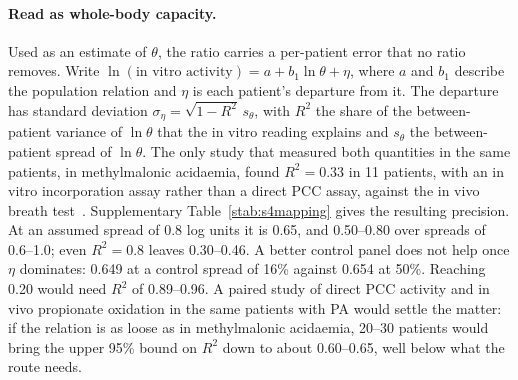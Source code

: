 \paragraph{Read as whole-body capacity.} Used as an estimate of $\theta$, the ratio carries a
per-patient error that no ratio removes. Write
$\ln(\text{in vitro activity})=a+b_1\ln\theta+\eta$, where $a$ and $b_1$ describe the population
relation and $\eta$ is each patient's departure from it. The departure has standard deviation
$\sigma_\eta=\sqrt{1-R^2}\,s_\theta$, with $R^2$ the share of the between-patient variance of
$\ln\theta$ that the in vitro reading explains and $s_\theta$ the between-patient spread of
$\ln\theta$. The only study that measured both quantities in the same patients, in
methylmalonic acidaemia, found $R^2=0.33$ in 11 patients, with an in vitro incorporation assay
rather than a direct PCC assay, against the in vivo breath test~\cite{breath_test_mma}.
Supplementary Table~\ref{stab:s4mapping} gives the resulting precision. At an assumed spread of
0.8 log units it is 0.65, and 0.50--0.80 over spreads of 0.6--1.0; even $R^2=0.8$ leaves
0.30--0.46. A better control panel does not help once $\eta$ dominates: 0.649 at a control
spread of 16\% against 0.654 at 50\%. Reaching 0.20 would need $R^2$ of 0.89--0.96. A paired
study of direct PCC activity and in vivo propionate oxidation in the same patients with PA would
settle the matter: if the relation is as loose as in methylmalonic acidaemia, 20--30 patients
would bring the upper 95\% bound on $R^2$ down to about 0.60--0.65, well below what the route
needs.


